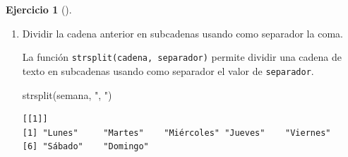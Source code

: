 \documentclass[
  spanish,
  a4paper,
]{scrreport}
\newenvironment{Shaded}{\begin{snugshade}}{\end{snugshade}}
\newcommand{\AttributeTok}[1]{\textcolor[rgb]{0.40,0.45,0.13}{#1}}
\newcommand{\FunctionTok}[1]{\textcolor[rgb]{0.28,0.35,0.67}{#1}}
\newcommand{\NormalTok}[1]{\textcolor[rgb]{0.00,0.23,0.31}{#1}}
\newcommand{\OtherTok}[1]{\textcolor[rgb]{0.00,0.23,0.31}{#1}}
\newcommand{\StringTok}[1]{\textcolor[rgb]{0.13,0.47,0.30}{#1}}
\theoremstyle{definition}
\newtheorem{exercise}{Ejercicio}[chapter]
\theoremstyle{remark}
\begin{document}
\begin{exercise}[]
\begin{enumerate}
\begin{tcolorbox}
\begin{Shaded}
\begin{Highlighting}[]
\NormalTok{semana }\OtherTok{\textless{}{-}} \FunctionTok{paste}\NormalTok{(dias, }\AttributeTok{collapse =} \StringTok{", "}\NormalTok{)}
\NormalTok{semana}
\end{Highlighting}
\end{Shaded}

\begin{verbatim}
[1] "Lunes, Martes, Miércoles, Jueves, Viernes, Sábado, Domingo"
\end{verbatim}

  \end{tcolorbox}
\item
  Dividir la cadena anterior en subcadenas usando como separador la
  coma.

  \begin{tcolorbox}[enhanced jigsaw, titlerule=0mm, arc=.35mm, rightrule=.15mm, opacitybacktitle=0.6, leftrule=.75mm, colframe=quarto-callout-tip-color-frame, toptitle=1mm, breakable, colbacktitle=quarto-callout-tip-color!10!white, bottomrule=.15mm, colback=white, left=2mm, bottomtitle=1mm, opacityback=0, title=\textcolor{quarto-callout-tip-color}{\faLightbulb}\hspace{0.5em}{Solución}, toprule=.15mm, coltitle=black]

  La función \texttt{strsplit(cadena,\ separador)} permite dividir una
  cadena de texto en subcadenas usando como separador el valor de
  \texttt{separador}.

\begin{Shaded}
\begin{Highlighting}[]
\FunctionTok{strsplit}\NormalTok{(semana, }\StringTok{", "}\NormalTok{)}
\end{Highlighting}
\end{Shaded}

\begin{verbatim}
[[1]]
[1] "Lunes"     "Martes"    "Miércoles" "Jueves"    "Viernes"  
[6] "Sábado"    "Domingo"  
\end{verbatim}

  \end{tcolorbox}
\end{enumerate}

\end{exercise}
\end{document}
